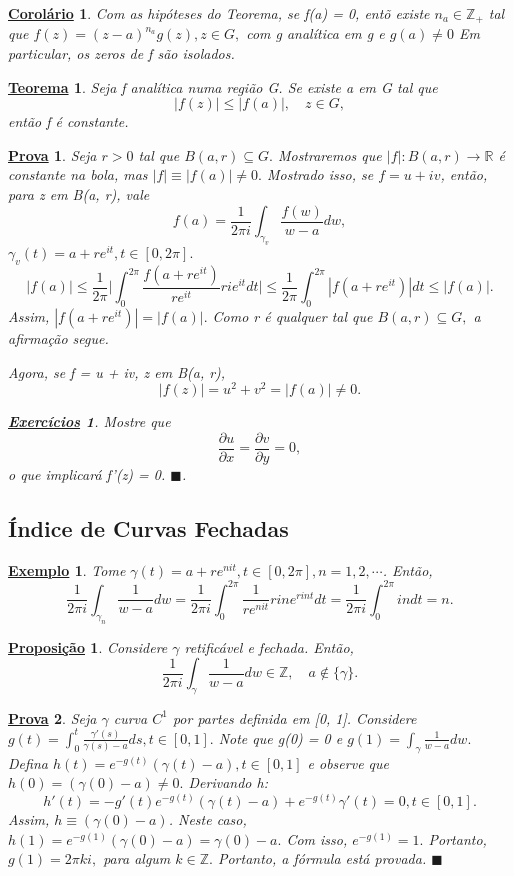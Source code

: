 \documentclass{article}
\newtheorem*{theorem*}{\underline{Teorema}}
\newtheorem{example}{\underline{Exemplo}}[section]
\newtheorem*{proof*}{\underline{Prova}}
\newtheorem*{prop*}{\underline{Proposi\c c\~ao}}
\newtheorem*{crl*}{\underline{Corol\'ario}}
\newtheorem*{exer*}{\underline{Exerc\'icios}}
\renewcommand\qedsymbol{$\blacksquare$}
\begin{document}
\begin{crl*}
  Com as hip\'oteses do Teorema, se f(a) = 0, ent\~o existe $n_a\in \mathbb{Z}_{+}$ tal que $f(z) = (z-a)^{n_a}g(z), z\in{G},$
 com g anal\'itica em g e $g(a)\neq0$ Em particular, os zeros de f s\~ao isolados.
\end{crl*}
\begin{theorem*}
  Seja f anal\'itica numa regi\~ao G. Se existe a em G tal que 
  $$
    |f(z)|\leq|f(a)|, \quad z\in{G},
  $$
ent\~ao f \'e constante.
\end{theorem*} 
\begin{proof*}
  Seja $r > 0$ tal que $B(a, r)\subseteq{G}.$ Mostraremos que $|f|:B(a, r)\rightarrow \mathbb{R}$ \'e constante na bola, mas $|f|\equiv|f(a)|\neq0.$
Mostrado isso, se $f = u + iv$, ent\~ao, para z em B(a, r), vale 
  $$
    f(a) = \frac{1}{2\pi i}\int_{\gamma_{v}}^{}\frac{f(w)}{w-a}dw,
  $$
  $\gamma_{v}(t) = a + re^{it}, t\in[0, 2\pi].$
  $$
    |f(a)|\leq \frac{1}{2\pi}\biggl|\int_{0}^{2\pi}\frac{f(a + re^{it})}{re^{it}}rie^{it}dt\biggr|\leq \frac{1}{2\pi}\int_{0}^{2\pi}|f(a + re^{it})|dt
  \leq |f(a)|.
  $$
  Assim, $|f(a+re^{it})| = |f(a)|.$ Como r \'e qualquer tal que $B(a, r)\subseteq{G},$ a afirma\c c\~ao segue.

  Agora, se f = u + iv, z em B(a, r),
    $$
      |f(z)| = u^{2} + v^{2} = |f(a)|\neq 0.
    $$
   \begin{exer*}
     Mostre que 
     $$
      \frac{\partial{u}}{\partial{x}} = \frac{\partial{v}}{\partial{y}} = 0,
     $$
     o que implicar\'a f'(z) = 0. \qedsymbol.
   \end{exer*}
\end{proof*}
\subsection{\'Indice de Curvas Fechadas}
\begin{example}
  Tome $\gamma(t) = a + re^{nit}, t\in[0, 2\pi], n=1, 2, \cdots$. Ent\~ao,
  $$
    \frac{1}{2\pi i}\int_{\gamma_{n}}^{}\frac{1}{w-a}dw = \frac{1}{2\pi  i}\int_{0}^{2\pi}\frac{1}{re^{nit}}rine^{rint}dt = \frac{1}{2\pi i}\int_{0}^{2\pi} indt = n.
  $$
\end{example}
\begin{prop*}
  Considere $\gamma$ retific\'avel e fechada. Ent\~ao, 
  $$
  \frac{1}{2\pi i}\int_{\gamma}^{}\frac{1}{w-a}dw\in \mathbb{Z}, \quad a\not\in \{\gamma\}.
  $$
\end{prop*}
\begin{proof*}
  Seja $\gamma$ curva $C^{1}$ por partes definida em [0, 1]. Considere $g(t) = \int_{0}^{t}\frac{\gamma'(s)}{\gamma(s) - a}ds, t\in[0, 1].$
Note que g(0) = 0 e $g(1) = \int_{\gamma}^{}\frac{1}{w-a}dw.$ Defina $h(t) = e^{-g(t)}(\gamma(t) - a), t\in[0, 1]$ e observe que
$h(0) = (\gamma(0) - a)\neq0.$ Derivando h:
  $$
  h'(t) = -g'(t)e^{-g(t)}(\gamma(t) - a) + e^{-g(t)}\gamma'(t) = 0, t\in[0, 1]. 
  $$
  Assim, $h\equiv{(\gamma(0) - a)}$. Neste caso, $h(1) = e^{-g(1)}(\gamma(0)-a) = \gamma(0) - a.$ Com isso, $e^{-g(1)} = 1.$ Portanto,
 $g(1) = 2\pi ki,$ para algum $k\in \mathbb{Z}.$ Portanto, a f\'ormula est\'a provada. \qedsymbol
\end{proof*}
\newpage
\end{document}
